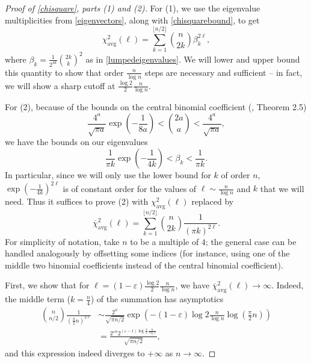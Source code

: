 \documentclass[11pt]{article}
\newcounter{r}
\newcounter{s}
\numberwithin{equation}{section}
\begin{document}
\begin{proof}[Proof of \cref{chisquare}, parts (1) and (2)]
For (1), we use the eigenvalue multiplicities from \cref{eigenvectors}, along with \cref{chisquarebound}, to get
\[
    \chi_{\text{avg}}^2(\ell) = \sum_{k = 1}^{\lfloor n/2 \rfloor} \binom{n}{2k} \beta_k^{2\ell},
\]
where $\beta_k = \frac{1}{2^{4k}} \binom{2k}{k}^2$ as in \cref{lumpedeigenvalues}. We will lower and upper bound this quantity to show that order $\frac{n}{\log n}$ steps are necessary and sufficient -- in fact, we will show a sharp cutoff at $\frac{\log 2}{2} \frac{n}{\log n}$.

\medskip

For (2), because of the bounds on the central binomial coefficient (\cite{stanica}, Theorem 2.5)
\begin{equation}\label{stanicabound}
    \frac{4^a}{\sqrt{\pi a}} \exp\left(-\frac{1}{8a}\right) <  \binom{2a}{a} < \frac{4^a}{\sqrt{\pi a}},
\end{equation}
we have the bounds on our eigenvalues
\[
    \frac{1}{\pi k} \exp\left(-\frac{1}{4k}\right) < \beta_k < \frac{1}{\pi k}.
\]
In particular, since we will only use the lower bound for $k$ of order $n$, $\exp\left(-\frac{1}{4k}\right)^{2\ell}$ is of constant order for the values of $\ell \sim \frac{n}{\log n}$ and $k$ that we will need. Thus it suffices to prove (2) with $\chi_{\text{avg}}^2(\ell)$ replaced by 
\[
    \overline{\chi}_{\text{avg}}^2(\ell) = \sum_{k=1}^{\lfloor n/2 \rfloor} \binom{n}{2k} \frac{1}{(\pi k)^{2\ell}}.
\]
For simplicity of notation, take $n$ to be a multiple of $4$; the general case can be handled analogously by offsetting some indices (for instance, using one of the middle two binomial coefficients instead of the central binomial coefficient). 

First, we show that for $\ell = (1 - \varepsilon) \frac{\log 2}{2} \frac{n}{\log n}$, we have $\overline{\chi}_{\text{avg}}^2(\ell) \to \infty$. Indeed, the middle term ($k = \frac{n}{4}$) of the summation has asymptotics
\begin{align*}
    \binom{n}{n/2} \frac{1}{(\frac{\pi}{2} n)^{2\ell}} &\sim \frac{2^n}{\sqrt{\pi n/2}} \exp\left(-(1 - \varepsilon) \log 2 \frac{n}{\log n} \log \left(\frac{\pi}{2} n\right)\right) \\
    &= \frac{2^{\varepsilon n} 2^{(\varepsilon - 1) \log \frac{\pi}{2} \frac{n}{\log n}}}{\sqrt{\pi n/2}},
\end{align*}
and this expression indeed diverges to $+\infty$ as $n \to \infty$. 


\end{proof}
\end{document}

